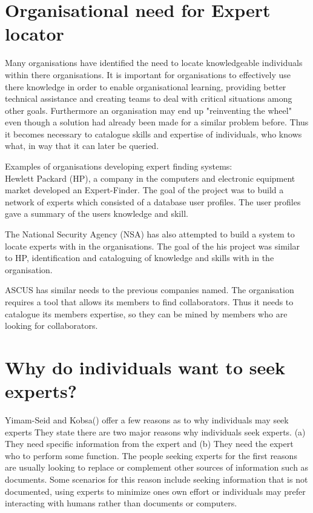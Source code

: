 \documentclass[a4paper,oneside,11pt]{report}
\begin{document}
\section{Organisational need for Expert locator}
Many organisations have identified the need to locate knowledgeable individuals within there organisations. It is important for organisations to effectively use there knowledge in order to enable organisational learning, providing better technical assistance and creating teams to deal with critical situations among other goals\autocite{ackerman2003sharing}. Furthermore an organisation may end up "reinventing the wheel" even though a solution had already been made for a similar problem before. Thus it becomes necessary to catalogue skills and expertise of individuals, who knows what,  in way that it can later be queried\autocite{fernandez2000}.

Examples of organisations developing expert finding systems: \\
Hewlett Packard (HP), a company in the computers and electronic equipment market developed  an Expert-Finder. The goal of the project was to build a network of experts which consisted of a database user profiles. The user profiles gave a summary of the users knowledge and skill\autocite{fernandez2000}.
 
The National Security Agency (NSA) has also attempted to build a system to locate experts with in the organisations. The goal of the his project was similar to HP, identification and cataloguing of knowledge and skills with in the organisation\autocite{fernandez2000}.

ASCUS has similar needs to the previous companies named. The organisation requires a tool that allows its members to find collaborators. Thus it needs to catalogue its members expertise, so they can be mined by members who are looking for collaborators. 
	
\section{Why do individuals want to seek experts?}
Yimam-Seid and Kobsa(\citeyear{kobsaseid2003}) offer a few reasons as to why individuals may seek experts They state there are two major reasons why individuals seek experts. (a) They need specific information from the expert and (b) They need the expert who to perform some function. The people seeking experts for the first reasons are usually looking to replace or complement other sources of information such as documents. Some scenarios for this reason include seeking information that is not documented, using experts to minimize ones own effort or individuals may prefer interacting with humans rather than documents or computers. 
\end{document}
